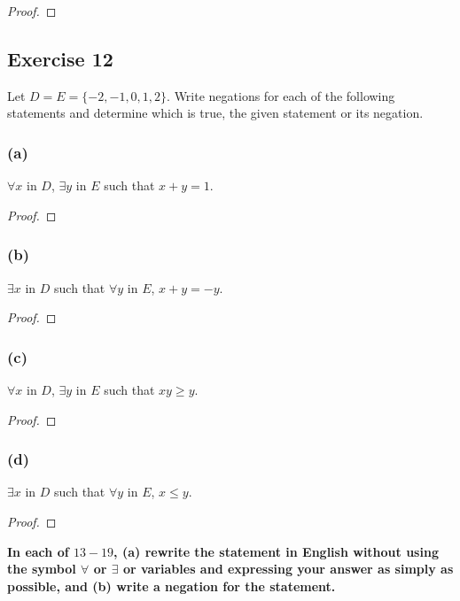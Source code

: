 \documentclass[14pt]{extarticle}
\newcommand{\fa}{\forall}
\newcommand{\te}{\exists}
\begin{document}
\begin{proof}

\end{proof}

\subsection{Exercise 12}
Let $D = E = \{-2, -1, 0, 1, 2\}$. Write negations for each of the following statements and determine which is true, the given statement or its negation.

\subsubsection{(a)}
$\fa x$ in $D$, $\te y$ in $E$ such that $x + y = 1$.

\begin{proof}

\end{proof}

\subsubsection{(b)}
$\te x$ in $D$ such that $\fa y$ in $E$, $x + y = -y$.

\begin{proof}

\end{proof}

\subsubsection{(c)}
$\fa x$ in $D$, $\te y$ in $E$ such that $xy \geq y$.

\begin{proof}

\end{proof}

\subsubsection{(d)}
$\te x$ in $D$ such that $\fa y$ in $E$, $x \leq y$.

\begin{proof}

\end{proof}

{\bf \color{cyan} In each of $13-19$, (a) rewrite the statement in English without using the symbol $\fa$ or $\te$ or variables and expressing your answer as simply as possible, and (b) write a negation for the statement.}
\end{document}
